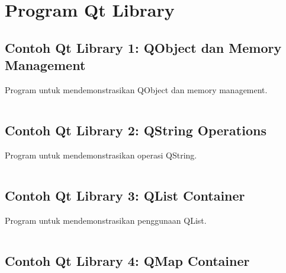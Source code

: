 \begin{lstlisting}[language=c++, caption=Menghapus Data SQLite]

\end{lstlisting}

\section{Program Qt Library}

\subsection{Contoh Qt Library 1: QObject dan Memory Management}

Program untuk mendemonstrasikan QObject dan memory management.

\begin{lstlisting}[language=c++, caption=QObject dan Memory Management]

\end{lstlisting}

\subsection{Contoh Qt Library 2: QString Operations}

Program untuk mendemonstrasikan operasi QString.

\begin{lstlisting}[language=c++, caption=QString Operations]

\end{lstlisting}

\subsection{Contoh Qt Library 3: QList Container}

Program untuk mendemonstrasikan penggunaan QList.

\begin{lstlisting}[language=c++, caption=QList Container]

\end{lstlisting}

\subsection{Contoh Qt Library 4: QMap Container}

